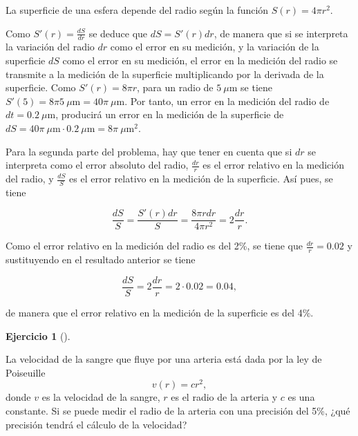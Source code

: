 \documentclass[
  spanish,
  a4paper,
]{scrreport}
\theoremstyle{definition}
\newtheorem{exercise}{Ejercicio}[chapter]
\theoremstyle{remark}
\begin{document}
\begin{tcolorbox}[enhanced jigsaw, arc=.35mm, bottomrule=.15mm, bottomtitle=1mm, breakable, colback=white, colbacktitle=quarto-callout-tip-color!10!white, colframe=quarto-callout-tip-color-frame, coltitle=black, left=2mm, leftrule=.75mm, opacityback=0, opacitybacktitle=0.6, rightrule=.15mm, title=\textcolor{quarto-callout-tip-color}{\faLightbulb}\hspace{0.5em}{Solución}, titlerule=0mm, toprule=.15mm, toptitle=1mm]

La superficie de una esfera depende del radio según la función
\(S(r) =4\pi r^2\).

Como \(S'(r) = \frac{dS}{dr}\) se deduce que \(dS=S'(r)dr\), de manera
que si se interpreta la variación del radio \(dr\) como el error en su
medición, y la variación de la superficie \(dS\) como el error en su
medición, el error en la medición del radio se transmite a la medición
de la superficie multiplicando por la derivada de la superficie. Como
\(S'(r)=8\pi r\), para un radio de \(5\ \mu\mbox{m}\) se tiene
\(S'(5) = 8\pi 5\ \mu\mbox{m} = 40\pi \ \mu\mbox{m}\). Por tanto, un
error en la medición del radio de \(dt=0.2\ \mu\mbox{m}\), producirá un
error en la medición de la superficie de
\(dS = 40\pi \ \mu\mbox{m} \cdot 0.2 \ \mu\mbox{m} = 8\pi \ \mu\mbox{m}^2.\)

Para la segunda parte del problema, hay que tener en cuenta que si
\(dr\) se interpreta como el error absoluto del radio, \(\frac{dr}{r}\)
es el error relativo en la medición del radio, y \(\frac{dS}{S}\) es el
error relativo en la medición de la superficie. Así pues, se tiene

\[
\frac{dS}{S} = \frac{S'(r)dr}{S} = \frac{8\pi r dr}{4\pi r^2} = 2\frac{dr}{r}.
\]

Como el error relativo en la medición del radio es del 2\%, se tiene que
\(\frac{dr}{r}=0.02\) y sustituyendo en el resultado anterior se tiene

\[
\frac{dS}{S} = 2\frac{dr}{r} = 2\cdot 0.02 = 0.04,
\]

de manera que el error relativo en la medición de la superficie es del
4\%.

\end{tcolorbox}

\begin{exercise}[]\protect\hypertarget{exr-transmision-errores-2}{}\label{exr-transmision-errores-2}

La velocidad de la sangre que fluye por una arteria está dada por la ley
de Poiseuille \[
v(r) = cr^2,
\] donde \(v\) es la velocidad de la sangre, \(r\) es el radio de la
arteria y \(c\) es una constante. Si se puede medir el radio de la
arteria con una precisión del 5\%, ¿qué precisión tendrá el cálculo de
la velocidad?

\end{exercise}
\end{document}
